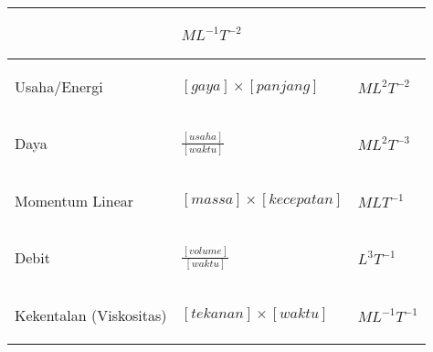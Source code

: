 \documentclass[12pt, a4paper]{article}\usepackage[utf8]{inputenc}
\theoremstyle{plain}
\theoremstyle{plain}
\numberwithin{equation}{section}
\theoremstyle{definition}
\begin{document}
\begin{center}
\begin{table}[!h]
\begin{tabular}{|p{}|p{}|p{}|}
\begin{center}
				\end{center}
				& \begin{center}
					$\displaystyle ML^{-1} T^{-2}$
				\end{center}
				\\
				\hline 
				\begin{center}
					Usaha/Energi
				\end{center}
				& \begin{center}
					$\displaystyle [ gaya] \times [ panjang]$
				\end{center}
				& \begin{center}
					$\displaystyle ML^{2} T^{-2}$
				\end{center}
				\\
				\hline 
				\begin{center}
					Daya
				\end{center}
				& \begin{center}
					$\displaystyle \frac{[ usaha]}{[ waktu]}$
				\end{center}
				& \begin{center}
					$\displaystyle ML^{2} T^{-3}$
				\end{center}
				\\
				\hline 
				\begin{center}
					Momentum Linear
				\end{center}
				& \begin{center}
					$\displaystyle [ massa] \times [ kecepatan]$
				\end{center}
				& \begin{center}
					$\displaystyle MLT^{-1}$
				\end{center}
				\\
				\hline 
				\begin{center}
					Debit
				\end{center}
				& \begin{center}
					$\displaystyle \frac{[ volume]}{[ waktu]}$
				\end{center}
				& \begin{center}
					$\displaystyle L^{3} T^{-1}$
				\end{center}
				\\
				\hline 
				{\begin{center}
						Kekentalan (Viskositas)
					\end{center}
				} & \begin{center}
					$\displaystyle [ tekanan] \times [ waktu]$
				\end{center}
				& \begin{center}
					$\displaystyle ML^{-1} T^{-1}$
				\end{center}
				\\
				\hline
			\end{tabular}
			
		\end{table}
	\end{center}
	
\end{document}
